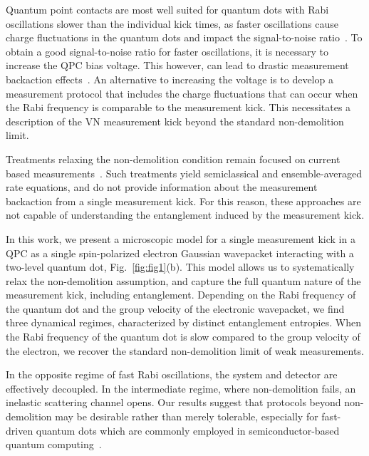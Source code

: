 \documentclass[10pt,
 amsmath,amssymb,
 aps,prb, twocolumn
]{revtex4-2}
\begin{document}
Quantum point contacts are most well suited for quantum dots with Rabi
oscillations slower than the individual kick times, as faster oscillations cause charge fluctuations in the quantum dots and impact the signal-to-noise ratio~\cite{reillyFastSinglechargeSensing2007,kumbhakarShotNoise2025}. To obtain a good signal-to-noise ratio for faster oscillations, it is necessary to increase the QPC bias voltage. This however, can lead to drastic measurement backaction effects~\cite{fergusonPopulationSwitch2023}. An alternative to increasing the voltage is to develop a measurement protocol that includes the charge fluctuations that can occur when the Rabi frequency is comparable to the measurement kick. This necessitates a description of the VN measurement kick beyond the standard non-demolition limit.

Treatments relaxing the non-demolition condition remain focused on current based measurements~\cite{engelMeasurementEfficiency2004, svastitsReadoutSweetSpots2026,
molmerQuantumNondemo2022, vaartjesMaximizingNondemo2026,
youngInelasticBackaction2010}. Such treatments yield semiclassical and ensemble-averaged rate equations, and do not provide information about the measurement backaction from a single measurement kick. For this reason, these approaches are not capable of understanding the entanglement induced by the measurement kick.
 
In this work, we present a microscopic model for a single measurement kick in a QPC as a single spin-polarized electron Gaussian wavepacket interacting with a two-level quantum dot, Fig.~\ref{fig:fig1}(b). This model allows us to systematically relax the non-demolition assumption, and capture the full quantum nature of the measurement kick, including entanglement. Depending on the Rabi frequency of the quantum dot and the group velocity of the electronic wavepacket, we find three dynamical regimes, characterized by distinct entanglement entropies. When the Rabi frequency of the quantum dot is slow compared to the group velocity of the electron, we recover the standard non-demolition limit of weak measurements. 

In the opposite regime of fast Rabi oscillations, the system and detector are effectively decoupled. In the intermediate regime, where non-demolition fails, an inelastic scattering channel opens. Our results suggest that protocols beyond non-demolition may be desirable rather than merely tolerable, especially for fast-driven quantum dots which are commonly employed in semiconductor-based quantum computing~\cite{lossQuantumComputation1998, scappucciGermaniumQuantum2021}.
\end{document}
